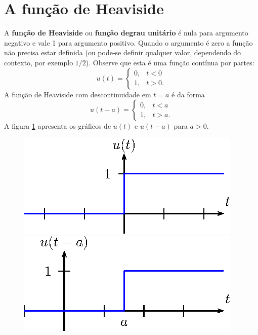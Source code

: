 \section{A função de Heaviside}
A {\bf função de Heaviside} ou {\bf função degrau unitário} é nula para argumento negativo e vale 1 para argumento positivo. Quando o argumento é zero a função não precisa estar definida (ou pode-se definir qualquer valor, dependendo do contexto, por exemplo $1/2$). Observe que esta é uma função contínua por partes:
\begin{equation}
 u(t)=\left\{ \begin{array}{ll} 0, &t<0\\1,&t>0. \end{array}\right.
\end{equation}
A função de Heaviside com descontinuidade em $t=a$ é da forma
\begin{equation}
 u(t-a)=\left\{ \begin{array}{ll} 0, &t<a\\1,&t>a. \end{array}\right.
\end{equation}
A figura \ref{fig_Heaviside} apresenta os gráficos de $u(t)$ e $u(t-a)$ para $a>0$.
\begin{figure}[!ht]
\begin{center}

\includegraphics{cap_trans_int/pics/figura_3}
\includegraphics{cap_trans_int/pics/figura_4}\end{center}
\caption{\label{fig_Heaviside}}
\end{figure}

